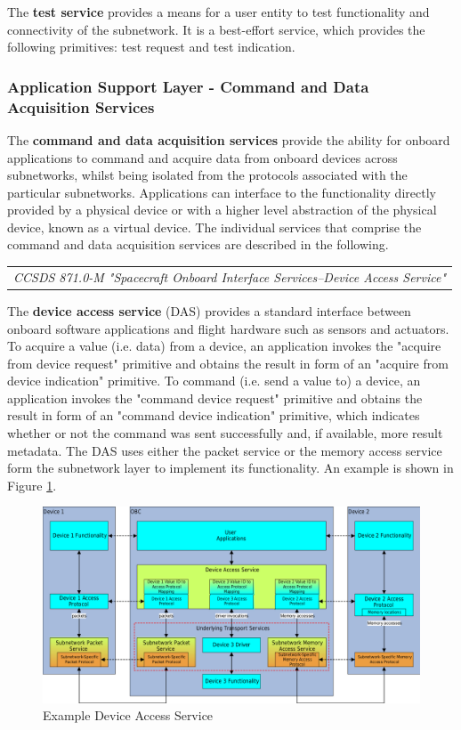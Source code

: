 The \textbf{test service} provides a means for a user entity to test functionality and connectivity of the subnetwork. It is a best-effort service, which provides the following primitives: test request and test indication.

\subsubsection{Application Support Layer - Command and Data Acquisition Services}

The \textbf{command and data acquisition services} provide the ability for onboard applications to command and acquire data from onboard devices across subnetworks, whilst being isolated from the protocols associated with the particular subnetworks. Applications can interface to the functionality directly provided by a physical device or with a higher level abstraction of the physical device, known as a virtual device. The individual services that comprise the command and data acquisition services are described in the following.

\begin{tabular}{l}
\textit{CCSDS 871.0-M "Spacecraft Onboard Interface Services--Device Access Service" \cite{CCSDS 871.0-M}} 
\end{tabular}

The \textbf{device access service} (DAS) provides a standard interface between onboard software applications and flight hardware such as sensors and actuators. To acquire a value (i.e. data) from a device, an application invokes the "acquire from device request" primitive and obtains the result in form of an "acquire from device indication" primitive. To command (i.e. send a value to) a device, an application invokes the "command device request" primitive and obtains the result in form of an "command device indication" primitive, which indicates whether or not the command was sent successfully and, if available, more result metadata. The DAS uses either the packet service or the memory access service form the subnetwork layer to implement its functionality. An example is shown in Figure \ref{fig:Example Device Access Service}.

\begin{figure}[h]
\centering\includegraphics[scale=0.3]{fig/example_device_access_service}
\caption{Example Device Access Service}
\label{fig:Example Device Access Service}
\end{figure}

